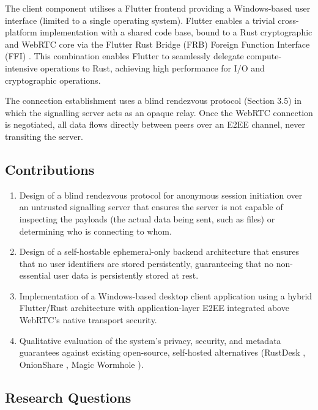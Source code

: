 \documentclass[12pt,a4paper]{article}
\begin{document}
The client component utilises a Flutter \cite{flutter} frontend providing a Windows-based user interface (limited to a single operating system). Flutter enables a trivial cross-platform implementation with a shared code base, bound to a Rust cryptographic and WebRTC core via the Flutter Rust Bridge (FRB) \cite{frb} Foreign Function Interface (FFI) \cite{flutterffi}. This combination enables Flutter to seamlessly delegate compute-intensive operations to Rust, achieving high performance for I/O and cryptographic operations.

The connection establishment uses a blind rendezvous protocol (Section 3.5) in which the signalling server acts as an opaque relay. Once the WebRTC connection is negotiated, all data flows directly between peers over an E2EE channel, never transiting the server.

\subsection{Contributions}

\begin{enumerate}

\item Design of a blind rendezvous protocol for anonymous session initiation over an untrusted signalling server that ensures the server is not capable of inspecting the payloads (the actual data being sent, such as files) or determining who is connecting to whom.

\item Design of a self-hostable ephemeral-only backend architecture that ensures that no user identifiers are stored persistently, guaranteeing that no non-essential user data is persistently stored at rest.

\item Implementation of a Windows-based desktop client application using a hybrid Flutter/Rust architecture with application-layer E2EE integrated above WebRTC’s native transport security.

\item Qualitative evaluation of the system’s privacy, security, and metadata guarantees against existing open-source, self-hosted alternatives (RustDesk \cite{rustdesk}, OnionShare \cite{onionshare}, Magic Wormhole \cite{magicwormhole}).

\end{enumerate}

\subsection{Research Questions}
\end{document}
